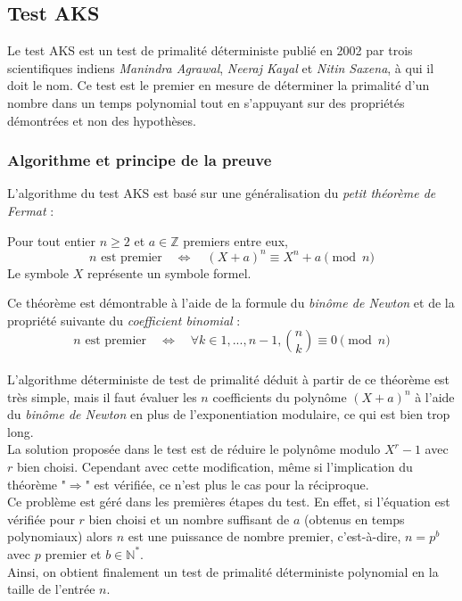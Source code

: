 \subsection{Test AKS}
	Le test AKS est un test de primalité déterministe publié en 2002 par trois scientifiques indiens \textit{Manindra Agrawal}, \textit{Neeraj Kayal} et \textit{Nitin Saxena}, à qui il doit le nom. Ce test est le premier en mesure de déterminer la primalité d'un nombre dans un temps polynomial tout en s'appuyant sur des propriétés démontrées et non des hypothèses.
		

	\subsubsection{Algorithme et principe de la preuve}
		L'algorithme du test AKS est basé sur une généralisation du \textit{petit théorème de Fermat} :
		
		\vspace{-1.5em}\begin{adjustwidth}{1.5cm}{1.5cm} 
		\begin{Th}
			\label{ThFermat4}
			Pour tout entier $n \geqslant 2$ et $a \in \mathbb{Z}$ premiers entre eux,
			\[n \text{  est premier} \quad \Leftrightarrow \quad (X + a)^{n} \equiv X^{n} + a \pmod n\] 
			Le symbole $X$ représente un symbole formel.
		\end{Th}
		\end{adjustwidth}\vspace{0.5em}
		
		Ce théorème est démontrable à l'aide de la formule du \textit{binôme de Newton} et de la propriété suivante du \textit{coefficient binomial} :
		\[n \text{  est premier} \quad \Leftrightarrow \quad \forall k \in {1, ...,n-1}, \binom{n}{k} \equiv 0 \pmod n\]
		
		\paragraph{}L'algorithme déterministe de test de primalité déduit à partir de ce théorème est très simple, mais il faut évaluer les $n$ coefficients du polynôme $(X + a)^{n}$ à l'aide du \textit{binôme de Newton} en plus de l'exponentiation modulaire, ce qui est bien trop long.\\
		La solution proposée dans le test est de réduire le polynôme modulo $X^{r} - 1$ avec $r$ bien choisi. Cependant avec cette modification, même si l'implication du théorème "$\Rightarrow$" est vérifiée, ce n'est plus le cas pour la réciproque.\\
		Ce problème est géré dans les premières étapes du test. En effet, si l'équation est vérifiée pour $r$ bien choisi et un nombre suffisant de $a$ (obtenus en temps polynomiaux) alors $n$ est une puissance de nombre premier, c'est-à-dire, $n = p^{b}$ avec $p$ premier et $b \in \mathbb{N}^{*}$.\\
		Ainsi, on obtient finalement un test de primalité déterministe polynomial en la taille de l'entrée $n$.
				
